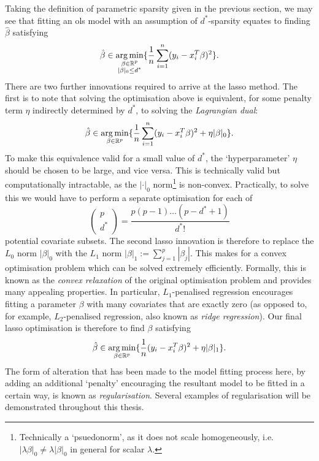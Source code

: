 \documentclass[thesis.tex]{subfiles}
\begin{document}
Taking the definition of parametric sparsity given in the previous section, we may see that fitting an \gls{ols} model with an assumption of $d^*$-sparsity equates to finding $\hat{\beta}$ satisfying
\[\hat{\beta} \in \operatorname*{arg\,min}_{\substack{\beta \in \mathbb{R}^p \\ |\beta|_0 \leq d^*}} \{{\frac{1}{n}\sum_{i=1}^n (y_i - x_i^T\beta)^2} \}.\]
There are two further innovations required to arrive at the \gls{lasso} method. The first is to note that solving the optimisation above is equivalent, for some penalty term $\eta$ indirectly determined by $d^*$, to solving the \emph{Lagrangian dual}:
\[\hat{\beta} \in \operatorname*{arg\,min}_{\beta \in \mathbb{R}^p} \{\frac{1}{n}\sum_{i=1}^n (y_i - x_i^T\beta)^2 + \eta |\beta|_0\}.\]
To make this equivalence valid for a small value of $d^*$, the `hyperparameter' $\eta$ should be chosen to be large, and vice versa. This is technically valid but computationally intractable, as the $|\cdot|_0$ norm\footnote{Technically a `psuedonorm', as it does not scale homogeneously, i.e. $|\lambda \beta|_0 \neq \lambda|\beta|_0$ in general for scalar $\lambda$.} is non-convex. Practically, to solve this we would have to perform a separate optimisation for each of 
\[\begin{pmatrix} p \\ d^* \end{pmatrix} = \frac{p(p-1)\dots(p-d^*+1)}{d^*!} \] 
potential covariate subsets. The second \gls{lasso} innovation is therefore to replace the $L_0$ norm $|\beta|_0$ with the $L_1$ norm $|\beta|_1 := \sum_{j=1}^p |\beta_j|$. This makes for a convex optimisation problem which can be solved extremely efficiently. Formally, this is known as the \emph{convex relaxation} of the original optimisation problem \citep[for a more thorough introduction see, for example, ][Chapter 7]{wainwright_high-dimensional_2019} and provides many appealing properties. In particular, $L_1$-penalised regression encourages fitting a parameter $\beta$ with many covariates that are exactly zero (as opposed to, for example, $L_2$-penalised regression, also known as \emph{ridge regression}). Our final \gls{lasso} optimisation is therefore to find $\beta$ satisfying
\[\hat{\beta} \in \operatorname*{arg\,min}_{\beta \in \mathbb{R}^p} \{\frac{1}{n}(y_i -x_i^T\beta)^2 + \eta |\beta|_1 \}.\]
The form of alteration that has been made to the model fitting process here, by adding an additional `penalty' encouraging the resultant model to be fitted in a certain way, is known as \emph{regularisation}. Several examples of regularisation will be demonstrated throughout this thesis. 
\end{document}
